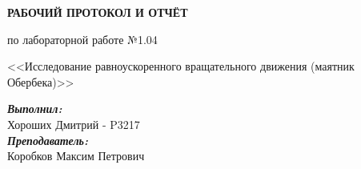 \documentclass[12pt, a4paper]{article}
\begin{document}

\vspace*{0.25\textheight}
\begin{center}
\textbf{\LARGE РАБОЧИЙ ПРОТОКОЛ И ОТЧЁТ }

\LARGE по лабораторной работе №1.04

\LARGE <<Исследование равноускоренного вращательного движения (маятник Обербека)>>

\end{center}
\vspace*{5cm}
\begin{flushright}
\begin{minipage}{.33\linewidth}
\textit{\textbf{Выполнил:}}\\
Хороших Дмитрий - P3217\\
\textit{\textbf{Преподаватель:}}\\
Коробков Максим Петрович
\end{minipage}
\end{flushright}


\thispagestyle{firstpage}
\newpage
\tableofcontents

\restoregeometry
\end{document}
